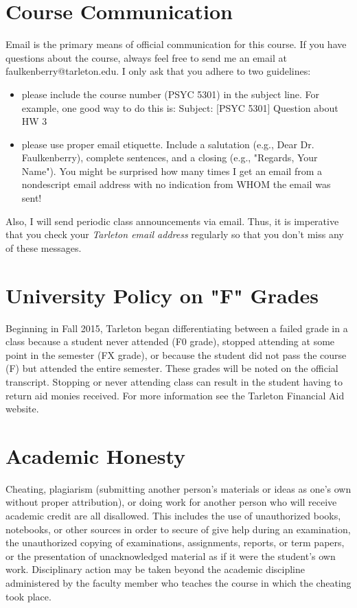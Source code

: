 \documentclass[10pt]{article}
\begin{document}
\section*{Course Communication}
\label{sec:orgf487c7a}

Email is the primary means of official communication for this course.  If you have questions about the course, always feel free to send me an email at faulkenberry@tarleton.edu.  I only ask that you adhere to two guidelines:
\begin{itemize}
\item please include the course number (PSYC 5301) in the subject line.  For example, one good way to do this is:  Subject: [PSYC 5301] Question about HW 3
\item please use proper email etiquette.  Include a salutation (e.g., Dear Dr. Faulkenberry), complete sentences, and a closing (e.g., "Regards, Your Name").  You might be surprised how many times I get an email from a nondescript email address with no indication from WHOM the email was sent!
\end{itemize}

Also, I will send periodic class announcements via email.  Thus, it is imperative that you check your \emph{Tarleton email address} regularly so that you don't miss any of these messages.

\section*{University Policy on "F" Grades}
\label{sec:org0d235e8}

Beginning in Fall 2015, Tarleton began differentiating between a failed grade in a class because a student never attended (F0 grade), stopped attending at some point in the semester (FX grade), or because the student did not pass the course (F) but attended the entire semester. These grades will be noted on the official transcript. Stopping or never attending class can result in the student having to return aid monies received.  For more information see the Tarleton Financial Aid website.

\section*{Academic Honesty}
\label{sec:orgb5ab5f9}

Cheating, plagiarism (submitting another person’s materials or ideas as one’s own without proper attribution), or doing work for another person who will receive academic credit are all disallowed. This includes the use of unauthorized books, notebooks, or other sources in order to secure of give help during an examination, the unauthorized copying of examinations, assignments, reports, or term papers, or the presentation of unacknowledged material as if it were the student’s own work. Disciplinary action may be taken beyond the academic discipline administered by the faculty member who teaches the course in which the cheating took place.
\end{document}
